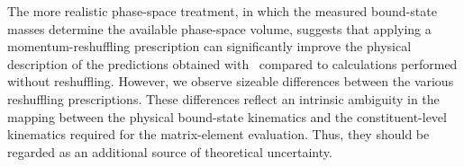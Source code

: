 The more realistic phase-space treatment, in which the measured bound-state masses determine the available phase-space volume, suggests that applying a momentum-reshuffling prescription can significantly improve the physical description of the predictions obtained with \mgshort\ compared to calculations performed without reshuffling. However, we observe sizeable differences between the various reshuffling prescriptions. These differences reflect an intrinsic ambiguity in the mapping between the physical bound-state kinematics and the constituent-level kinematics required for the matrix-element evaluation. Thus, they should be regarded as an additional source of theoretical uncertainty.

